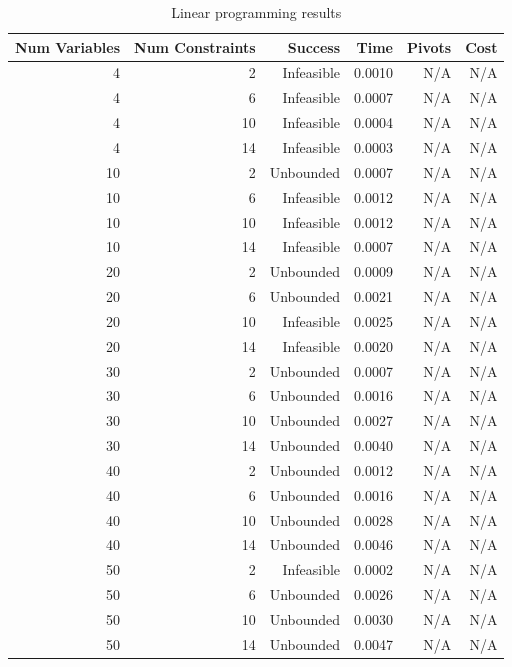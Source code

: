 \begin{table}[ht]
    \centering
    \begin{tabular}{rrrrrr}
        \toprule
        Num Variables & Num Constraints & Success & Time & Pivots & Cost \\
        \midrule
        4 & 2 & Infeasible & 0.0010 & N/A & N/A \\
		4 & 6 & Infeasible & 0.0007 & N/A & N/A \\
		4 & 10 & Infeasible & 0.0004 & N/A & N/A \\
		4 & 14 & Infeasible & 0.0003 & N/A & N/A \\
		10 & 2 & Unbounded & 0.0007 & N/A & N/A \\
		10 & 6 & Infeasible & 0.0012 & N/A & N/A \\
		10 & 10 & Infeasible & 0.0012 & N/A & N/A \\
		10 & 14 & Infeasible & 0.0007 & N/A & N/A \\
		20 & 2 & Unbounded & 0.0009 & N/A & N/A \\
		20 & 6 & Unbounded & 0.0021 & N/A & N/A \\
		20 & 10 & Infeasible & 0.0025 & N/A & N/A \\
		20 & 14 & Infeasible & 0.0020 & N/A & N/A \\
		30 & 2 & Unbounded & 0.0007 & N/A & N/A \\
		30 & 6 & Unbounded & 0.0016 & N/A & N/A \\
		30 & 10 & Unbounded & 0.0027 & N/A & N/A \\
		30 & 14 & Unbounded & 0.0040 & N/A & N/A \\
		40 & 2 & Unbounded & 0.0012 & N/A & N/A \\
		40 & 6 & Unbounded & 0.0016 & N/A & N/A \\
		40 & 10 & Unbounded & 0.0028 & N/A & N/A \\
		40 & 14 & Unbounded & 0.0046 & N/A & N/A \\
		50 & 2 & Infeasible & 0.0002 & N/A & N/A \\
		50 & 6 & Unbounded & 0.0026 & N/A & N/A \\
		50 & 10 & Unbounded & 0.0030 & N/A & N/A \\
		50 & 14 & Unbounded & 0.0047 & N/A & N/A \\
        \bottomrule
    \end{tabular}
    \caption{Linear programming results}
    \label{tab:lp-results}
\end{table}